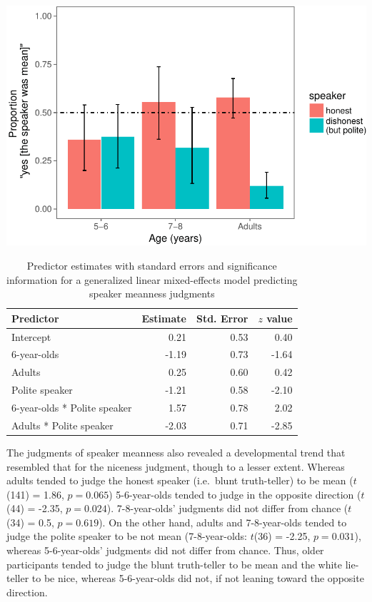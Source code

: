 \documentclass[a4paper,man,apacite,floatsintext]{apa6}
\newenvironment{CodeChunk}{}{}
\begin{document}
\begin{CodeChunk}

\includegraphics{figs/unnamed-chunk-3-1} \end{CodeChunk}

\begin{table}[h]
\centering
\begin{tabular}{lrrr}
 Predictor & Estimate & Std. Error & $z$ value \\ 
  \hline
Intercept & 0.21 & 0.53 & 0.40 \\ 
  6-year-olds & -1.19 & 0.73 & -1.64 \\ 
  Adults & 0.25 & 0.60 & 0.42 \\ 
  Polite speaker & -1.21 & 0.58 & -2.10 \\ 
  6-year-olds * Polite speaker & 1.57 & 0.78 & 2.02 \\ 
  Adults * Polite speaker & -2.03 & 0.71 & -2.85 \\ 
   \hline
\end{tabular}
\caption{Predictor estimates with standard errors and significance information for a generalized linear mixed-effects model predicting speaker meanness judgments} 
\label{tab:nice_tab}
\end{table}

The judgments of speaker meanness also revealed a developmental trend
that resembled that for the niceness judgment, though to a lesser
extent. Whereas adults tended to judge the honest speaker (i.e.~blunt
truth-teller) to be mean (\(t\)(141) = 1.86, \(p =0.065\)) 5-6-year-olds
tended to judge in the opposite direction (\(t\)(44) = -2.35,
\(p =0.024\)). 7-8-year-olds' judgments did not differ from chance
(\(t\)(34) = 0.5, \(p =0.619\)). On the other hand, adults and
7-8-year-olds tended to judge the polite speaker to be not mean
(7-8-year-olds: \(t\)(36) = -2.25, \(p =0.031\)), whereas 5-6-year-olds'
judgments did not differ from chance. Thus, older participants tended to
judge the blunt truth-teller to be mean and the white lie-teller to be
nice, whereas 5-6-year-olds did not, if not leaning toward the opposite
direction.
\end{document}
